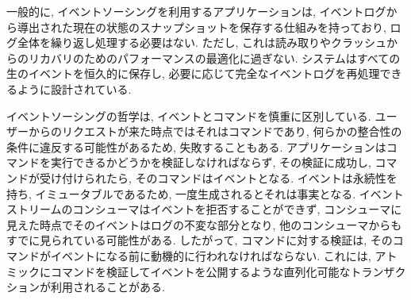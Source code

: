 \documentclass[../../../main]{subfiles}
\begin{document}
    一般的に, イベントソーシングを利用するアプリケーションは, イベントログから導出された現在の状態のスナップショットを保存する仕組みを持っており, ログ全体を繰り返し処理する必要はない. ただし, これは読み取りやクラッシュからのリカバリのためのパフォーマンスの最適化に過ぎない. システムはすべての生のイベントを恒久的に保存し, 必要に応じて完全なイベントログを再処理できるように設計されている.

    イベントソーシングの哲学は, イベントとコマンドを慎重に区別している. ユーザーからのリクエストが来た時点ではそれはコマンドであり, 何らかの整合性の条件に違反する可能性があるため, 失敗することもある. アプリケーションはコマンドを実行できるかどうかを検証しなければならず, その検証に成功し, コマンドが受け付けられたら, そのコマンドはイベントとなる. イベントは永続性を持ち, イミュータブルであるため, 一度生成されるとそれは事実となる. イベントストリームのコンシューマはイベントを拒否することができず, コンシューマに見えた時点でそのイベントはログの不変な部分となり, 他のコンシューマからもすでに見られている可能性がある. したがって, コマンドに対する検証は, そのコマンドがイベントになる前に動機的に行われなければならない. これには, アトミックにコマンドを検証してイベントを公開するような直列化可能なトランザクションが利用されることがある.
\end{document}
